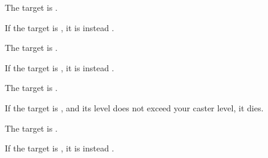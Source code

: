 \begin{spellheader}
    \spellrng{\rngclose}
    \spelldur{\durshort}
\end{spellheader}
\begin{spelleffects}
    \spelleffect The target is \sickened.

    If the target is \bloodied, it is instead \blinded.
\end{spelleffects}
\begin{spellfooter}

\end{spellfooter}

\begin{spellheader}
    \spellrng{\rngclose}
    \spelldur{\durshort}
\end{spellheader}
\begin{spelleffects}
    \spelleffect The target is \bewildered.

    If the target is \bloodied, it is instead \confused.
\end{spelleffects}
\begin{spellfooter}

\end{spellfooter}

\begin{spellheader}
    \spellrng{\rngclose}
    \spelldur{\durshort}
\end{spellheader}
\begin{spelleffects}
    \spelleffect The target is \sickened.

    If the target is \bloodied, and its level does not exceed your caster level, it dies.
\end{spelleffects}
\begin{spellfooter}

\end{spellfooter}

\begin{spellheader}
    \spellrng{\rngclose}
    \spelldur{\durshort}
\end{spellheader}
\begin{spelleffects}
    \spelleffect The target is \bewildered.

    If the target is \bloodied, it is instead \stunned.
\end{spelleffects}
\begin{spellfooter}

\end{spellfooter}

